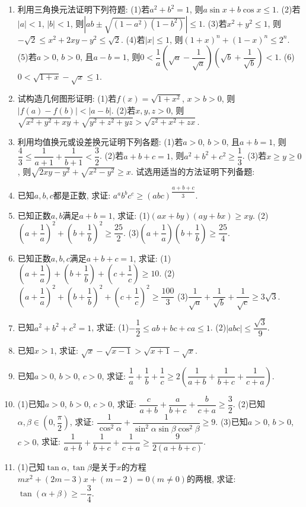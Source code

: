 \documentclass[10pt,a4paper]{article}
\begin{document}
\begin{enumerate}[1.]
    \item 利用三角换元法证明下列符题:
    (1)若$a^2+b^2=1$, 则$a\sin x+b\cos x\le 1$.
    (2)若$|a|<1$, $|b|<1$, 则$|ab\pm \sqrt{(1-{a^2})(1-{b^2})}|\le 1$.
    (3)若$x^2+y^2\le 1$, 则$-\sqrt 2\le {x^2}+2xy-{y^2}\le \sqrt 2$.
    (4)若$|x|\le 1$, 则$(1+x)^n+(1-x)^n\le 2^n$.
    (5)若$a>0$, $b>0$, 且$a-b=1$, 则$0<\dfrac 1a(\sqrt a-\dfrac 1{\sqrt a})(\sqrt b+\dfrac 1{\sqrt b})<1$.
    (6)$0<\sqrt{1+x}-\sqrt x\le 1$.
    \item 试构造几何图形证明:
    (1)若$f(x)=\sqrt{1+{x^2}}$, $x>b>0$, 则$|f(a)-f(b)|<|a-b|$.
    (2)若$x,y,z>0$, 则$\sqrt{{x^2}+{y^2}+xy}+\sqrt{{y^2}+{z^2}+yz}>\sqrt{{z^2}+{x^2}+zx}$.
    \item 利用均值换元或设差换元证明下列各题:
    (1)若$a>0$, $b>0$, 且$a+b=1$, 则$\dfrac 43\le \dfrac 1{a+1}+\dfrac 1{b+1}<\dfrac 32$.
    (2)若$a+b+c=1$, 则${a^2}+{b^2}+{c^2}\ge \dfrac 13$.
    (3)若$x\ge y\ge 0$, 则$\sqrt{2xy-{y^2}}+\sqrt{{x^2}-{y^2}}\ge x$.
    试选用适当的方法证明下列备题:
    \item 已知$a,b,c$都是正数, 求证: ${a^a}{b^b}{c^c}\ge {{(abc)}^{\dfrac{a+b+c}3}}$.
    \item 已知正数$a,b$满足$a+b=1$, 求证:
    (1)$(ax+by)(ay+bx)\ge xy$.
    (2)$(a+\dfrac 1a)^2+(b+\dfrac 1b)^2\ge \dfrac{25}2$.
    (3)$(a+\dfrac 1a)(b+\dfrac 1b)\ge \dfrac{25}4$.
    \item 已知正数$a,b,c$满足$a+b+c=1$, 求证:
    (1)$(a+\dfrac 1a)+(b+\dfrac 1b)+(c+\dfrac 1c)\ge 10$.
    (2)$(a+\dfrac 1a)^2+(b+\dfrac 1b)^2+(c+\dfrac 1c)^2\ge \dfrac{100}3$
    (3)$\dfrac 1{\sqrt a}+\dfrac 1{\sqrt b}+\dfrac 1{\sqrt c}\ge 3\sqrt 3$.
    \item 已知$a^2+b^2+c^2=1$, 求证:
    (1)$-\dfrac 12\le ab+bc+ca\le 1$.					(2)$|abc|\le \dfrac{\sqrt 3}9$.
    \item 已知$x>1$, 求证: $\sqrt x-\sqrt{x-1}>\sqrt{x+1}-\sqrt x$.
    \item 已知$a>0$, $b>0$, $c>0$, 求证: $\dfrac 1a+\dfrac 1b+\dfrac 1c\ge 2(\dfrac 1{a+b}+\dfrac 1{b+c}+\dfrac 1{c+a})$.
    \item (1)已知$a>0$, $b>0$, $c>0$, 求证: $\dfrac c{a+b}+\dfrac a{b+c}+\dfrac b{c+a}\ge \dfrac 32$.
      (2)已知$\alpha ,\beta \in (0,\dfrac{\pi }2)$, 求证: $\dfrac 1{{{\cos }^2}\alpha }+\dfrac 1{{{\sin }^2}\alpha \sin \beta {{\cos }^2}\beta }\ge 9$.
      (3)已知$a>0$, $b>0$, $c>0$, 求证: $\dfrac 1{a+b}+\dfrac 1{b+c}+\dfrac 1{c+a}\ge \dfrac 9{2(a+b+c)}$.
    \item (1)己知$\tan \alpha ,\tan \beta$是关于$x$的方程$mx^2+(2m-3)x+(m-2)=0(m\ne 0)$的两根, 求证: $\tan (\alpha +\beta)\ge -\dfrac 34$.

\end{enumerate}
\end{document}

